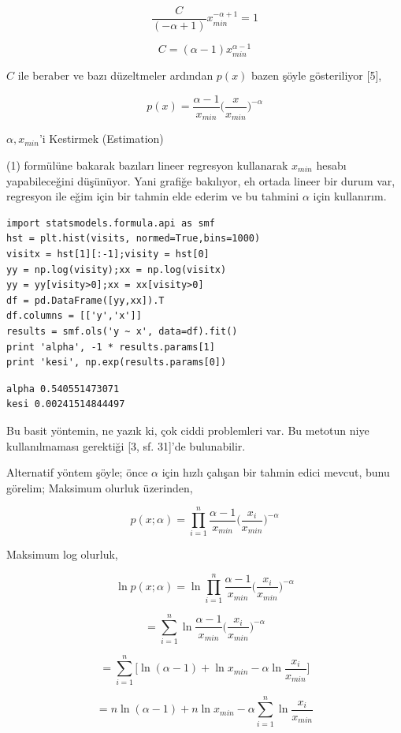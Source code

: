 \documentclass[12pt,fleqn]{article}\usepackage{../../common}
\begin{document}
$$ \frac{C}{(-\alpha+1) }  x_{min}^{-\alpha+1} = 1$$

$$ C = (\alpha-1)x_{min}^{\alpha-1} $$

$C$ ile beraber ve bazı düzeltmeler ardından $p(x)$ bazen şöyle
gösteriliyor [5], 

$$ p(x) = \frac{\alpha-1}{x_{min}}\bigg( \frac{x}{x_{min}} \bigg)^{-\alpha}  $$

$\alpha,x_{min}$'i Kestirmek (Estimation)

(1) formülüne bakarak bazıları lineer regresyon kullanarak $x_{min}$ hesabı
yapabileceğini düşünüyor. Yani grafiğe bakılıyor, eh ortada lineer bir
durum var, regresyon ile eğim için bir tahmin elde ederim ve bu tahmini
$\alpha$ için kullanırım. 

\begin{verbatim}
import statsmodels.formula.api as smf
hst = plt.hist(visits, normed=True,bins=1000)
visitx = hst[1][:-1];visity = hst[0]
yy = np.log(visity);xx = np.log(visitx)
yy = yy[visity>0];xx = xx[visity>0]
df = pd.DataFrame([yy,xx]).T
df.columns = [['y','x']]
results = smf.ols('y ~ x', data=df).fit()
print 'alpha', -1 * results.params[1]
print 'kesi', np.exp(results.params[0])
\end{verbatim}

\begin{verbatim}
alpha 0.540551473071
kesi 0.00241514844497
\end{verbatim}

Bu basit yöntemin, ne yazık ki, çok ciddi problemleri var. Bu metotun niye
kullanılmaması gerektiği [3, sf. 31]'de bulunabilir.

Alternatif yöntem şöyle; önce $\alpha$ için hızlı çalışan bir tahmin edici
mevcut, bunu görelim; Maksimum olurluk üzerinden,

$$ p(x;\alpha) = \prod_{i=1}^{n} \frac{\alpha-1}{x_{min}} \bigg( \frac{x_i}{x_{min}}\bigg)^{-\alpha}  $$

Maksimum log olurluk,

$$ \ln p(x;\alpha) = \ln \prod_{i=1}^{n} \frac{\alpha-1}{x_{min}} \bigg( \frac{x_i}{x_{min}}\bigg)^{-\alpha}  $$

$$ = \sum_{i=1}^{n} \ln \frac{\alpha-1}{x_{min}} \bigg( \frac{x_i}{x_{min}}\bigg)^{-\alpha}  $$

$$ = \sum_{i=1}^{n} \bigg[ \ln (\alpha-1) + \ln x_{min} - \alpha \ln \frac{x_i}{x_{min}} \bigg]   $$

$$ = n \ln (\alpha-1) + n \ln x_{min} - \alpha \sum_{i=1}^{n}  \ln \frac{x_i}{x_{min}}   $$
\end{document}

